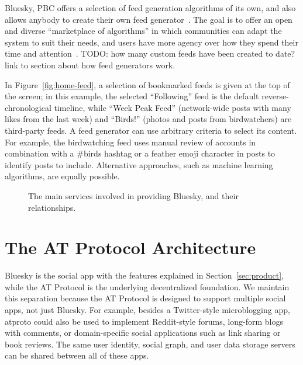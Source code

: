 \documentclass[sigconf,review]{acmart}
\begin{document}
Bluesky, PBC offers a selection of feed generation algorithms of its own, and also allows anybody to create their own feed generator~\cite{CustomFeeds}.
The goal is to offer an open and diverse ``marketplace of algorithms'' in which communities can adapt the system to suit their needs, and users have more agency over how they spend their time and attention~\cite{AlgorithmicChoice}.
TODO: how many custom feeds have been created to date? link to section about how feed generators work.

In Figure~\ref{fig:home-feed}, a selection of bookmarked feeds is given at the top of the screen; in this example, the selected ``Following'' feed is the default reverse-chronological timeline, while ``Week Peak Feed'' (network-wide posts with many likes from the last week) and ``Birds!'' (photos and posts from birdwatchers) are third-party feeds.
A feed generator can use arbitrary criteria to select its content.
For example, the birdwatching feed uses manual review of accounts in combination with a \#birds hashtag or a feather emoji character in posts to identify posts to include.
Alternative approaches, such as machine learning algorithms, are equally possible.

\begin{figure}
    \centering
    \caption{The main services involved in providing Bluesky, and their relationships.}
    \label{fig:indexing}
\end{figure}

\section{The AT Protocol Architecture}\label{sec:architecture}

Bluesky is the social app with the features explained in Section~\ref{sec:product}, while the AT Protocol is the underlying decentralized foundation.
We maintain this separation because the AT Protocol is designed to support multiple social apps, not just Bluesky.
For example, besides a Twitter-style microblogging app, atproto could also be used to implement Reddit-style forums, long-form blogs with comments, or domain-specific social applications such as link sharing or book reviews.
The same user identity, social graph, and user data storage servers can be shared between all of these apps.
\end{document}

